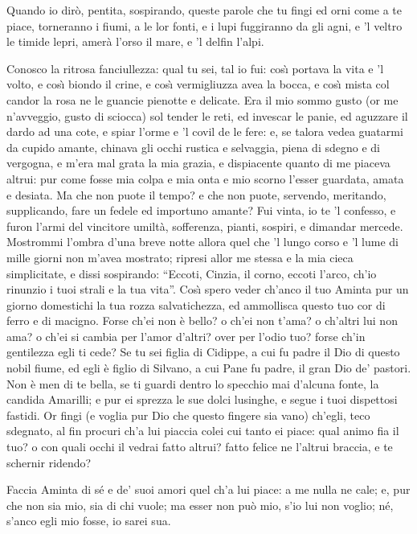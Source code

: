 \documentclass{book}
\begin{document}
	\3 Quando io dir\`o, pentita, sospirando,
	queste parole che tu fingi ed orni
	come a te piace, torneranno i fiumi,
	a le lor fonti, e i lupi fuggiranno
	da gli agni, e 'l veltro le timide lepri,
	amer\`a l'orso il mare, e 'l delfin l'alpi.

	\2 Conosco la ritrosa fanciullezza:
	qual tu sei, tal io fui: cos\`{\i} portava
	la vita e 'l volto, e cos\`{\i} biondo il crine,
	e cos\`{\i} vermigliuzza avea la bocca,
	e cos\`{\i} mista col candor la rosa
	ne le guancie pienotte e delicate.
	Era il mio sommo gusto (or me n'avveggio,
	gusto di sciocca) sol tender le reti,
	ed invescar le panie, ed aguzzare
	il dardo ad una cote, e spiar l'orme
	e 'l covil de le fere: e, se talora
	vedea guatarmi da cupido amante,
	chinava gli occhi rustica e selvaggia,
	piena di sdegno e di vergogna, e m'era
	mal grata la mia grazia, e dispiacente
	quanto di me piaceva altrui: pur come
	fosse mia colpa e mia onta e mio scorno
	l'esser guardata, amata e desiata.
	Ma che non puote il tempo? e che non puote,
	servendo, meritando, supplicando,
	fare un fedele ed importuno amante?
	Fui vinta, io te 'l confesso, e furon l'armi
	del vincitore umilt\`a, sofferenza,
	pianti, sospiri, e dimandar mercede.
	Mostrommi l'ombra d'una breve notte
	allora quel che 'l lungo corso e 'l lume
	di mille giorni non m'avea mostrato;
	ripresi allor me stessa e la mia cieca
	simplicitate, e dissi sospirando:
	``Eccoti, Cinzia, il corno, eccoti l'arco,
	ch'io rinunzio i tuoi strali e la tua vita''.
	Cos\`{\i} spero veder ch'anco il tuo Aminta
	pur un giorno domestichi la tua
	rozza salvatichezza, ed ammollisca
	questo tuo cor di ferro e di macigno.
	Forse ch'ei non \`e bello? o ch'ei non t'ama?
	o ch'altri lui non ama? o ch'ei si cambia
	per l'amor d'altri? over per l'odio tuo?
	forse ch'in gentilezza egli ti cede?
	Se tu sei figlia di Cidippe, a cui
	fu padre il Dio di questo nobil fiume,
	ed egli \`e figlio di Silvano, a cui
	Pane fu padre, il gran Dio de' pastori.
	Non \`e men di te bella, se ti guardi
	dentro lo specchio mai d'alcuna fonte,
	la candida Amarilli; e pur ei sprezza
	le sue dolci lusinghe, e segue i tuoi
	dispettosi fastidi. Or fingi (e voglia
	pur Dio che questo fingere sia vano)
	ch'egli, teco sdegnato, al fin procuri
	ch'a lui piaccia colei cui tanto ei piace:
	qual animo fia il tuo? o con quali occhi
	il vedrai fatto altrui? fatto felice
	ne l'altrui braccia, e te schernir ridendo?

	\3 Faccia Aminta di s\'e e de' suoi amori
	quel ch'a lui piace: a me nulla ne cale;
	e, pur che non sia mio, sia di chi vuole;
	ma esser non pu\`o mio, s'io lui non voglio;
	n\'e, s'anco egli mio fosse, io sarei sua.
\end{document}
